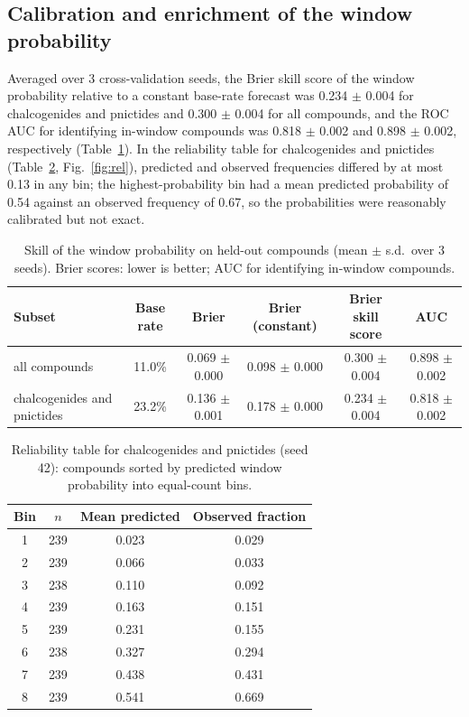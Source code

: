\documentclass[11pt,a4paper]{article}
\begin{document}
\subsection{Calibration and enrichment of the window probability}\label{sec:cal}
Averaged over 3 cross-validation seeds, the Brier skill score of the window probability relative to a constant base-rate forecast was 0.234 $\pm$ 0.004 for chalcogenides and pnictides and 0.300 $\pm$ 0.004 for all compounds, and the ROC AUC for identifying in-window compounds was 0.818 $\pm$ 0.002 and 0.898 $\pm$ 0.002, respectively (Table~\ref{tab:cal}). In the reliability table for chalcogenides and pnictides (Table~\ref{tab:rel}, Fig.~\ref{fig:rel}), predicted and observed frequencies differed by at most 0.13 in any bin; the highest-probability bin had a mean predicted probability of 0.54 against an observed frequency of 0.67, so the probabilities were reasonably calibrated but not exact.

\begin{table}[H]\centering\small\caption{Skill of the window probability on held-out compounds (mean $\pm$ s.d.\ over 3 seeds). Brier scores: lower is better; AUC for identifying in-window compounds.}\label{tab:cal}
\begin{tabular}{lccccc}\toprule Subset & Base rate & Brier & Brier (constant) & Brier skill score & AUC\\\midrule
all compounds & 11.0\% & 0.069 $\pm$ 0.000 & 0.098 $\pm$ 0.000 & 0.300 $\pm$ 0.004 & 0.898 $\pm$ 0.002 \\
chalcogenides and pnictides & 23.2\% & 0.136 $\pm$ 0.001 & 0.178 $\pm$ 0.000 & 0.234 $\pm$ 0.004 & 0.818 $\pm$ 0.002 \\
\bottomrule\end{tabular}\end{table}

\begin{table}[H]\centering\small\caption{Reliability table for chalcogenides and pnictides (seed 42): compounds sorted by predicted window probability into equal-count bins.}\label{tab:rel}
\begin{tabular}{cccc}\toprule Bin & $n$ & Mean predicted & Observed fraction\\\midrule
1 & 239 & 0.023 & 0.029 \\
2 & 239 & 0.066 & 0.033 \\
3 & 238 & 0.110 & 0.092 \\
4 & 239 & 0.163 & 0.151 \\
5 & 239 & 0.231 & 0.155 \\
6 & 238 & 0.327 & 0.294 \\
7 & 239 & 0.438 & 0.431 \\
8 & 239 & 0.541 & 0.669 \\
\bottomrule\end{tabular}\end{table}
\end{document}
